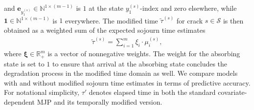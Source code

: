 and $\bm{e}_{y_{1}^{(s)}} \in \mathbb{N}^{1 \times (m-1)}$ is $1$ at the state $y_{1}^{(s)}$-index and zero elsewhere, while $\bm{1} \in \mathbb{N}^{1 \times (m-1)}$ is $1$ everywhere. 
The modified time $\widetilde{\tau}^{(s)}$ for crack $s \in \mathcal S$ is then obtained as a weighted sum of the expected sojourn time estimates
\begin{align}
\widetilde\tau^{(s)}= \sum_{i = 1}^m \xi_i  \cdot \mu_i^{(s)}, \label{eq:warped_time}
\end{align}
where $\bm{\xi} \in \mathbb{R}_+^m$ is a vector of nonnegative weights. 
The weight for the absorbing state is set to $1$ to ensure that arrival at the absorbing state concludes the degradation process in the modified time domain as well.
We compare models with and without modified sojourn time estimates in terms of predictive accuracy. For notational simplicity, $\tau'$ denotes elapsed time in both the standard covariate-dependent MJP and its temporally modified version.


%



